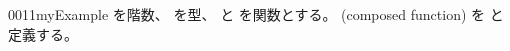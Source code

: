 \documentclass[index]{subfiles}
\begin{document}
\begin{myBlock}{0011}{myExample}
  を階数、
  を型、
  と
  を関数とする。
  (composed function)
  を
  と定義する。
\end{myBlock}
\end{document}
